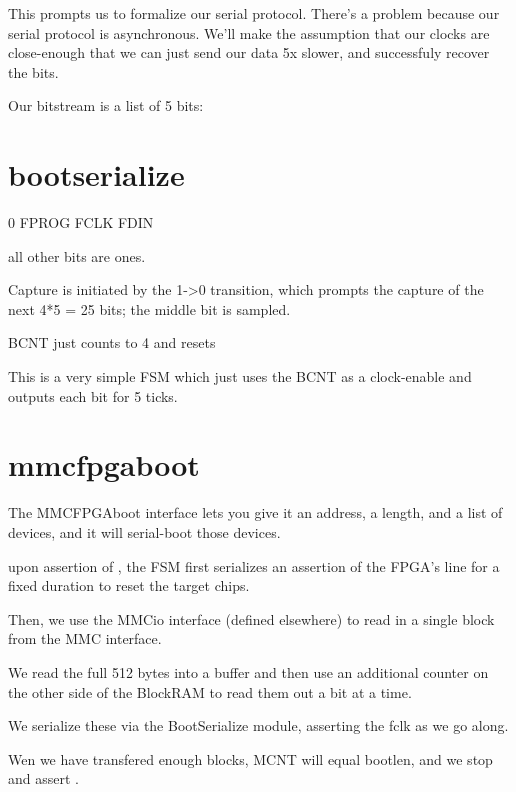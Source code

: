 

This prompts us to formalize our serial protocol. There's a problem
because our serial protocol is asynchronous. We'll make the assumption
that our clocks are close-enough that we can just send our data 5x
slower, and successfuly recover the bits.


Our bitstream is a list of 5 bits:


\section{bootserialize}

0
FPROG
FCLK
FDIN

all other bits are ones. 

Capture is initiated by the 1->0 transition, which prompts the capture
of the next 4*5 = 25 bits; the middle bit is sampled.

BCNT just counts to 4 and resets

This is a very simple FSM which just uses the BCNT as a clock-enable
and outputs each bit for 5 ticks.


\section{mmcfpgaboot}

The MMCFPGAboot interface lets you give it an address, a length, and a
list of devices, and it will serial-boot those devices.

upon assertion of , the FSM first serializes an
assertion of the FPGA's  line for a fixed duration to
reset the target chips.

Then, we use the MMCio interface (defined elsewhere) to read in a
single block from the MMC interface.

We read the full 512 bytes into a buffer and then use an additional
counter on the other side of the BlockRAM to read them out a bit at a
time. 

We serialize these via the BootSerialize module, asserting the fclk as
we go along.

Wen we have transfered enough blocks, MCNT will equal bootlen, and we
stop and assert .

